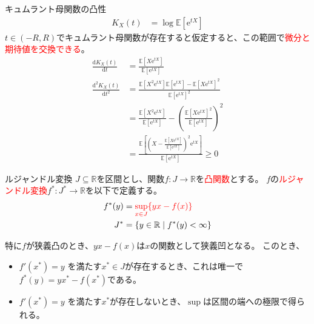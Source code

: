 \documentclass[lualatex,handout]{beamer}
\newcommand{\emm}[1]{\textcolor{red}{#1}}
\newcommand{\expt}[1]{\mathbb{E}\left[#1\right]}
\theoremstyle{definition}
\begin{document}
\begin{frame}{キュムラント母関数の凸性}
\begin{align*}
K_X(t) &= \log \expt{\mathrm{e}^{tX}}
\end{align*}
$t\in(-R, R)$でキュムラント母関数が存在すると仮定すると、この範囲で\emm{微分と期待値を交換できる}。
\begin{align*}
\frac{\mathrm{d} K_X(t)}{\mathrm{d}t} &= \frac{\expt{X\mathrm{e}^{tX}}}{\expt{\mathrm{e}^{tX}}}\\
\frac{\mathrm{d}^2 K_X(t)}{\mathrm{d}t^2} &= \frac{\expt{X^2\mathrm{e}^{tX}}\expt{\mathrm{e}^{tX}}-\expt{X\mathrm{e}^{tX}}^2}{\expt{\mathrm{e}^{tX}}^2}\\
&= \frac{\expt{X^2\mathrm{e}^{tX}}}{\expt{\mathrm{e}^{tX}}}-\left(\frac{\expt{X\mathrm{e}^{tX}}^2}{\expt{\mathrm{e}^{tX}}}\right)^2\\
&= \frac{\expt{\left(X-\frac{\expt{X\mathrm{e}^{tX}}}{\expt{\mathrm{e}^{tX}}}\right)^2\mathrm{e}^{tX}}}{\expt{\mathrm{e}^{tX}}}\ge 0
\end{align*}
\end{frame}

\begin{frame}{ルジャンドル変換}
$J\subseteq\mathbb{R}$を区間とし、関数$f\colon J\to\mathbb{R}$を\emm{凸関数}とする。
$f$の\emm{ルジャンドル変換}$f^*\colon J^*\to\mathbb{R}$を以下で定義する。
\begin{align*}
f^*(y) &= \emm{\sup_{x\in J}\{yx - f(x)\}}\\
J^*&=\{y\in\mathbb{R}\mid f^*(y)<\infty\}
\end{align*}

\vspace{1em}
特に$f$が狭義凸のとき、$yx-f(x)$は$x$の関数として狭義凹となる。
このとき、
\begin{itemize}
\setlength{\itemsep}{1em}
\item $f'(x^*) = y$ を満たす$x^*\in J$が存在するとき、これは唯一で$f^*(y) = yx^* - f(x^*)$である。
\item $f'(x^*) = y$ を満たす$x^*$が存在しないとき、$\sup$は区間の端への極限で得られる。
\end{itemize}
\end{frame}
\end{document}
